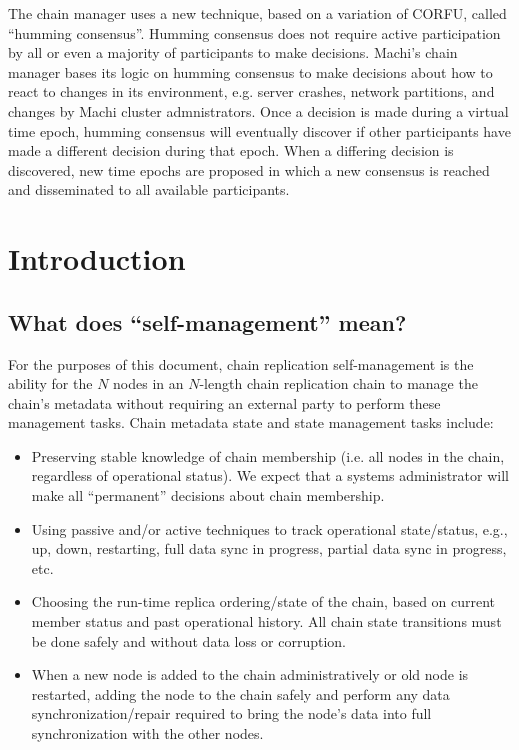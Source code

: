 \documentclass[preprint,10pt]{sigplanconf}
\begin{document}
The chain
manager uses a new technique, based on a variation of CORFU, called
``humming consensus''.
Humming consensus does not require active participation by all or even
a majority of participants to make decisions.  Machi's chain manager
bases its logic on humming consensus to make decisions about how to
react to changes in its environment, e.g. server crashes, network
partitions, and changes by Machi cluster admnistrators.  Once a
decision is made during a virtual time epoch, humming consensus will
eventually discover if other participants have made a different
decision during that epoch.  When a differing decision is discovered,
new time epochs are proposed in which a new consensus is reached and
disseminated to all available participants.

\section{Introduction}
\label{sec:introduction}

\subsection{What does ``self-management'' mean?}
\label{sub:self-management}

For the purposes of this document, chain replication self-management
is the ability for the $N$ nodes in an $N$-length chain replication chain
to manage the chain's metadata without requiring an external party
to perform these management tasks.  Chain metadata state and state
management tasks include:

\begin{itemize}
\item Preserving stable knowledge of chain membership (i.e. all nodes in
   the chain, regardless of operational status). We expect that a systems
   administrator will make all ``permanent'' decisions about
   chain membership.
\item Using passive and/or active techniques to track operational
   state/status, e.g., up, down, restarting, full data sync in progress, partial
   data sync in progress, etc.
\item Choosing the run-time replica ordering/state of the chain, based on
   current member status and past operational history.  All chain
   state transitions must be done safely and without data loss or
   corruption.
\item When a new node is added to the chain administratively or old node is
   restarted, adding the node to the chain safely and perform any data
   synchronization/repair required to bring the node's data into
   full synchronization with the other nodes.
\end{itemize}
\end{document}
